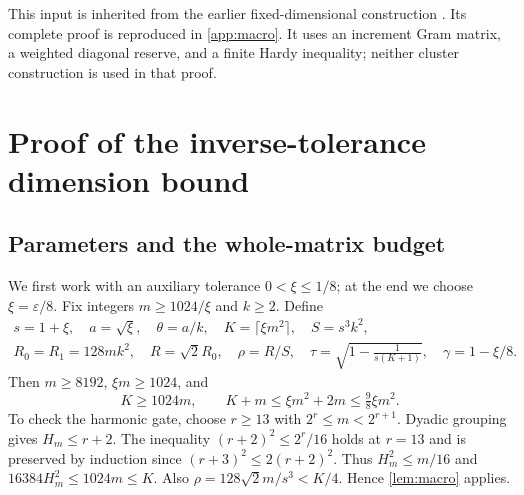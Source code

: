 
This input is inherited from the earlier fixed-dimensional construction
\cite{Tripodo,PublishedFinite}. Its complete proof is reproduced in
\cref{app:macro}. It uses an increment Gram matrix, a weighted diagonal
reserve, and a finite Hardy inequality; neither cluster construction is
used in that proof.

\section{Proof of the inverse-tolerance dimension bound}\label{sec:epsilon-proof}

\subsection{Parameters and the whole-matrix budget}

We first work with an auxiliary tolerance $0<\xi\le1/8$; at the end we
choose $\xi=\varepsilon/8$. Fix integers $m\ge1024/\xi$ and $k\ge2$. Define
\begin{gather}\label{eq:epsilon-parameters}
 s=1+\xi,\quad a=\sqrt\xi,\quad\theta=a/k,\quad
 K=\lceil\xi m^2\rceil,\quad S=s^3k^2,\\
 R_0=R_1=128mk^2,\quad R=\sqrt2R_0,\quad\rho=R/S,
 \quad\tau=\sqrt{1-\frac1{s(K+1)}},\quad\gamma=1-\xi/8.\nonumber
\end{gather}
Then $m\ge8192$, $\xi m\ge1024$, and
\[
 K\ge1024m,\qquad K+m\le\xi m^2+2m\le\tfrac98\xi m^2.
\]
To check the harmonic gate, choose $r\ge13$ with $2^r\le m<2^{r+1}$.
Dyadic grouping gives $H_m\le r+2$. The inequality
$(r+2)^2\le2^r/16$ holds at $r=13$ and is preserved by induction since
$(r+3)^2\le2(r+2)^2$. Thus $H_m^2\le m/16$ and
$16384H_m^2\le1024m\le K$. Also
$\rho=128\sqrt2m/s^3<K/4$. Hence \cref{lem:macro} applies.

